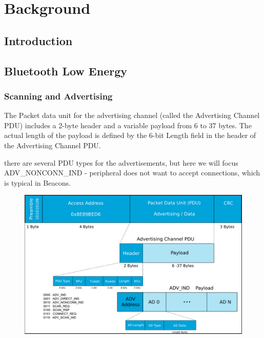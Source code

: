 \chapter{Background}

    \section{Introduction}

    \section{Bluetooth Low Energy}
      \subsection{Scanning and Advertising}
      The Packet data unit for the advertising channel (called the Advertising
      Channel PDU) includes a 2-byte header and a variable payload from 6 to 37
      bytes. The actual length of the payload is defined by the 6-bit Length field
      in the header of the Advertising Channel PDU.

      there are several PDU types for the advertisements, but here we will focus
      ADV\_NONCONN\_IND - peripheral does not want to accept connections, which is
      typical in Beacons.

      \FloatBarrier
      \begin{figure}[h]
        \includegraphics[width=\textwidth]{Images/ble_advertisement_packet.PNG}
      \end{figure}
      \FloatBarrier

